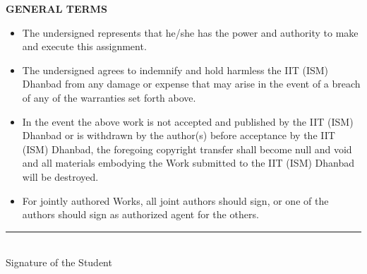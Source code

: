 \clearpage
\thispagestyle{empty}
\noindent
\textbf{GENERAL TERMS}

\begin{itemize}
    \item The undersigned represents that he/she has the power and authority to make and execute this assignment.
    \item The undersigned agrees to indemnify and hold harmless the IIT (ISM) Dhanbad from any damage or expense that may arise in the event of a breach of any of the warranties set forth above.
    \item In the event the above work is not accepted and published by the IIT (ISM) Dhanbad or is withdrawn by the author(s) before acceptance by the IIT (ISM) Dhanbad, the foregoing copyright transfer shall become null and void and all materials embodying the Work submitted to the IIT (ISM) Dhanbad will be destroyed.
    \item For jointly authored Works, all joint authors should sign, or one of the authors should sign as authorized agent for the others.
\end{itemize}

\vspace{2cm}

\noindent
\begin{flushright}
    \rule{5.5cm}{0.5pt} \\
    Signature of the Student
\end{flushright}